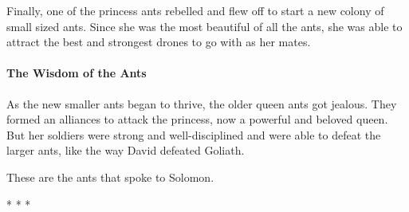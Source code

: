 Finally, one of the princess ants rebelled and flew off to start a new colony of small sized ants. Since she was the most beautiful of all the ants, she was able to attract the best and strongest drones to go with as her mates.

\paragraph{The Wisdom of the Ants}


As the new smaller ants began to thrive, the older queen ants got jealous. They formed an alliances to attack the princess, now a powerful and beloved queen. But her soldiers were strong and well-disciplined and were able to defeat the larger ants, like the way David defeated Goliath.

These are the ants that spoke to Solomon.



\begin{center}* * *\end{center}

